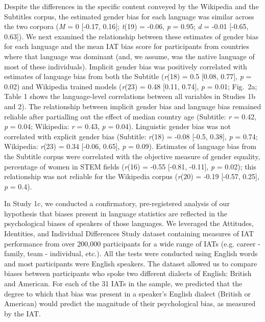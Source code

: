 \documentclass[9pt,twocolumn,twoside,lineno]{pnas-new}
\begin{document}
Despite the differences in the specific content conveyed by the
Wikipedia and the Subtitles corpus, the estimated gender bias for each
language was similar across the two corpora (\emph{M} = 0 {[}-0.17, 0.16{]}; \emph{t}(19) = -0.06, \emph{p} = 0.95; \emph{d} = -0.01 {[}-0.65, 0.63{]}). We next examined the relationship between these
estimates of gender bias for each language and the mean IAT bias score
for participants from countries where that language was dominant (and,
we assume, was the native language of most of these individuals).
Implicit gender bias was positively correlated with estimates of
language bias from both the Subtitle (\emph{r}(18) = 0.5 {[}0.08, 0.77{]}, \emph{p} = 0.02)
and Wikipedia trained models (\emph{r}(23) = 0.48 {[}0.11, 0.74{]}, \emph{p} = 0.01; Fig.\ 2a;
Table 1 shows the language-level correlations between all variables in
Studies 1b and 2). The relationship between implicit gender bias and
language bias remained reliable after partialling out the effect of
median country age (Subtitle: \emph{r} = 0.42, \emph{p} = 0.04; Wikipedia: \emph{r} = 0.43, \emph{p} = 0.04). Linguistic gender bias was
not correlated with explicit gender bias (Subtitle: \emph{r}(18) = -0.08 {[}-0.5, 0.38{]}, \emph{p} = 0.74; Wikipedia: \emph{r}(23) = 0.34 {[}-0.06, 0.65{]}, \emph{p} = 0.09). Estimates
of language bias from the Subtitle corpus were correlated with the
objective measure of gender equality, percentage of women in STEM fields
(\emph{r}(16) = -0.55 {[}-0.81, -0.11{]}, \emph{p} = 0.02); this relationship was not reliable
for the Wikipedia corpus (\emph{r}(20) = -0.19 {[}-0.57, 0.25{]}, \emph{p} = 0.4).


In Study 1c, we conducted a confirmatory, pre-registered analysis of our hypothesis that biases present in language statistics are reflected in the psychological biases of speakers of those languages. We leveraged the Attitudes, Identities, and Individual Differences Study dataset \citep[AIID,][]{aiid} containing measures of IAT performance from over 200,000 participants for a wide range of IATs (e.g. career - family, team - individual, etc.). All the tests were conducted using English words and most participants were English speakers. The dataset allowed us to compare biases between participants who spoke two different dialects of English: British and American. For each of the 31 IATs in the sample, we predicted that the degree to which that bias was present in a speaker’s English dialect (British or American) would predict the magnitude of their psychological bias, as measured by the IAT.
\end{document}
